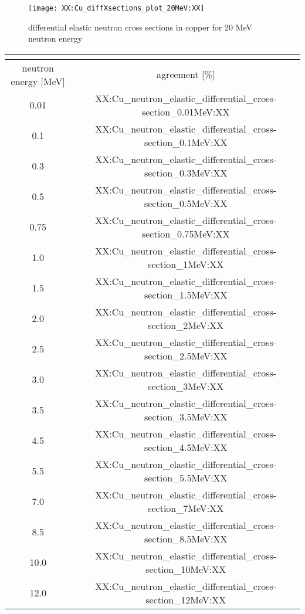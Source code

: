 \begin{figure}[h]
\centering
	\texttt{[image: XX:Cu\_diffXsections\_plot\_20MeV:XX]}
	\caption[diff. neutron cross sections (20 MeV)]{differential elastic neutron cross sections in copper for 20 MeV neutron energy}
	\label{fig:CuNeutronDiffXsectionplot2MeV}
\end{figure}

{\footnotesize
\begin{longtable}{|c|c|}
	\captionabove{differential elastic neutron cross sections for Cu \cite{XX}} \label{tab:CuneutronDiffXsection}\\
	\hline
	neutron energy [MeV] & agreement [\%]\\
	\hline
	\endhead
	0.01 & XX:Cu_neutron_elastic_differential_cross-section_0.01MeV:XX\\
	\hline
	0.1 & XX:Cu_neutron_elastic_differential_cross-section_0.1MeV:XX\\
	\hline
	0.3 & XX:Cu_neutron_elastic_differential_cross-section_0.3MeV:XX\\
	\hline
	0.5 & XX:Cu_neutron_elastic_differential_cross-section_0.5MeV:XX\\
	\hline
	0.75 & XX:Cu_neutron_elastic_differential_cross-section_0.75MeV:XX\\
	\hline
	1.0 & XX:Cu_neutron_elastic_differential_cross-section_1MeV:XX\\
	\hline
	1.5 & XX:Cu_neutron_elastic_differential_cross-section_1.5MeV:XX\\
	\hline
	2.0 & XX:Cu_neutron_elastic_differential_cross-section_2MeV:XX\\
	\hline
	2.5 & XX:Cu_neutron_elastic_differential_cross-section_2.5MeV:XX\\
	\hline
	3.0 & XX:Cu_neutron_elastic_differential_cross-section_3MeV:XX\\
	\hline
	3.5 & XX:Cu_neutron_elastic_differential_cross-section_3.5MeV:XX\\
	\hline
	4.5 & XX:Cu_neutron_elastic_differential_cross-section_4.5MeV:XX\\
	\hline
	5.5 & XX:Cu_neutron_elastic_differential_cross-section_5.5MeV:XX\\
	\hline
	7.0 & XX:Cu_neutron_elastic_differential_cross-section_7MeV:XX\\
	\hline
	8.5 & XX:Cu_neutron_elastic_differential_cross-section_8.5MeV:XX\\
	\hline
	10.0 & XX:Cu_neutron_elastic_differential_cross-section_10MeV:XX\\
	\hline
	12.0 & XX:Cu_neutron_elastic_differential_cross-section_12MeV:XX\\

\end{longtable}}
